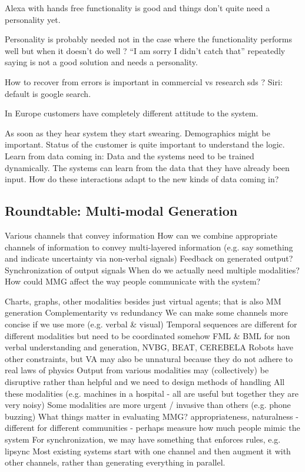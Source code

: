 \documentclass[12pt]{article}
\begin{document}
Alexa with hands free functionality is good and things don’t quite need a personality yet.

Personality is probably needed not in the case where the functionality performs well but when it doesn’t do well ? “I am sorry I didn’t catch that” repeatedly saying is not a good solution and needs a personality.

How to recover from errors is important in commercial vs research sds ? Siri: default is google search.

In Europe customers have completely different attitude to the system.

As soon as they hear system they start swearing.
Demographics might be important.
Status of the customer is quite important to understand the logic.
Learn from data coming in: Data and the systems need to be trained dynamically. The systems can learn from the data that they have already been input. How do these interactions adapt to the new kinds of data coming in?


\subsection{Roundtable: Multi-modal Generation}
Various channels that convey information
How can we combine appropriate channels of information to convey multi-layered information (e.g. say something and indicate uncertainty via non-verbal signals)
Feedback on generated output?
Synchronization of output signals
When do we actually need multiple modalities?
How could MMG affect the way people communicate with the system?

Charts, graphs, other modalities besides just virtual agents; that is also MM generation
Complementarity vs redundancy
We can make some channels more concise if we use more (e.g. verbal & visual)
Temporal sequences are different for different modalities but need to be coordinated somehow
FML & BML for non verbal understanding and generation, NVBG, BEAT, CEREBELA
Robots have other constraints, but VA may also be unnatural because they do not adhere to real laws of physics
Output from various modalities may (collectively) be disruptive rather than helpful and we need to design methods of handling All these modalities (e.g. machines in a hospital - all are useful but together they are very noisy)
Some modalities are more urgent / invasive than others (e.g. phone buzzing)
What things matter in evaluating MMG? appropriateness, naturalness - different for different communities - perhaps measure how much people mimic the system
For synchronization, we may have something that enforces rules, e.g. lipsync
Most existing systems start with one channel and then augment it with other channels, rather than generating everything in parallel.
\end{document}
